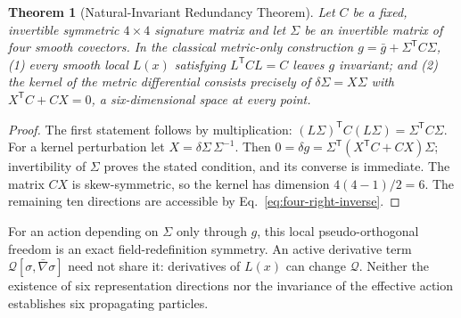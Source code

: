 \documentclass[11pt,a4paper]{article}
\newtheorem{theorem}{Theorem}[section]
\begin{document}
\begin{theorem}[Natural-Invariant Redundancy Theorem]
\label{thm:qgd062-redundancy}
Let $C$ be a fixed, invertible symmetric $4\times4$ signature matrix and
let $\Sigma$ be an invertible matrix of four smooth covectors. In the
classical metric-only construction $g=\bar g+\Sigma^{\mathsf T}C\Sigma$,
(1) every smooth local $L(x)$ satisfying $L^{\mathsf T}CL=C$ leaves
$g$ invariant; and (2) the kernel of the metric differential consists
\emph{precisely} of $\delta\Sigma=X\Sigma$ with
$X^{\mathsf T}C+CX=0$, a six-dimensional space at every point.
\end{theorem}
\begin{proof}
The first statement follows by multiplication:
$(L\Sigma)^{\mathsf T}C(L\Sigma)=\Sigma^{\mathsf T}C\Sigma$.
For a kernel perturbation let $X=\delta\Sigma\,\Sigma^{-1}$.
Then
$0=\delta g=\Sigma^{\mathsf T}(X^{\mathsf T}C+CX)\Sigma$;
invertibility of $\Sigma$ proves the stated condition, and its
converse is immediate. The matrix $CX$ is skew-symmetric, so the
kernel has dimension $4(4-1)/2=6$. The remaining ten directions are
accessible by Eq.~\eqref{eq:four-right-inverse}.
\end{proof}
\noindent For an action depending on $\Sigma$ only through $g$,
this local pseudo-orthogonal freedom is an exact field-redefinition
symmetry. An active derivative term $\mathcal Q[\sigma,\bar\nabla\sigma]$
need not share it: derivatives of $L(x)$ can change $\mathcal Q$.
Neither the existence of six representation directions nor the
invariance of the effective action establishes six propagating particles.



\end{document}
